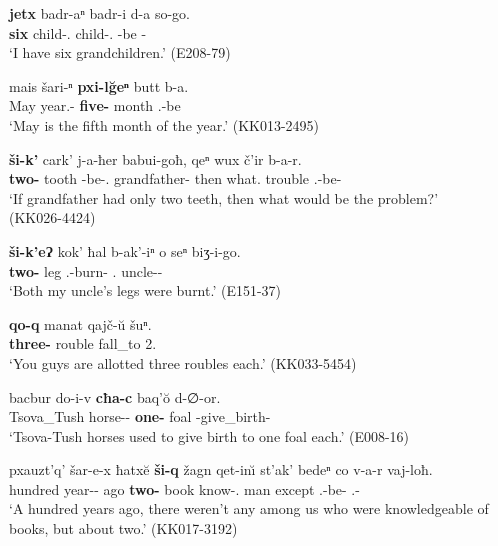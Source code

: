 \begin{exe}
	\ex\label{simplenp-ex4} \begin{xlist}
		
		\ex\label{simplenp-ex4a}
		\gll \textbf{jetx} badr-aⁿ badr-i d-a so-go. \\
		\textbf{six} child-{\Gen}.{\Pl} child-{\Nom}.{\Pl} {\D}-be {\Fsg}-{\Adess} \\
		\trans `I have six grandchildren.'
		\hfill (E208-79)
		
		\ex\label{simplenp-ex4b}
		\gll mais šari-ⁿ \textbf{pxi-l\u{g}eⁿ} butt b-a. \\
		May year.{\Obl}-{\Gen} \textbf{five-{\Ord}} month {\B}.{\Sg}-be \\
		\trans `May is the fifth month of the year.'
		\hfill (KK013-2495)
		
		\ex\label{simplenp-ex4c}
		\gll \textbf{ši-k'} cark' j-a-ħer babui-goħ, qeⁿ wux č'ir b-a-r. \\
		\textbf{two-{\Rstrct}} tooth {\J}-be-{\Cond}.{\Aor} grandfather-{\Adess} then what.{\Nom} trouble {\B}.{\Sg}-be-{\Imprf} \\
		\trans `If grandfather had only two teeth, then what would be the problem?' \\
		\hfill (KK026-4424)
		
		\ex\label{simplenp-ex4d}
		\gll \textbf{ši-k'eɁ} kok' ħal b-ak'-iⁿ o seⁿ biʒ-i-go.    \\
		\textbf{two-{\Incl}} leg {\Pv} {\B}.{\Sg}-burn-{\Aor} {\Dist} {\Fsg}.{\Gen} uncle-{\Obl}-{\Adess} \\
		\trans `Both my uncle's legs were burnt.'
		\hfill (E151-37)
		
		\ex\label{simplenp-ex4e}
		\gll \textbf{qo-q} manat qajč-\u{u} šuⁿ. \\
		\textbf{three-{\Distr}} rouble fall\_to 2{\Pl}.{\Dat}  \\
		\trans `You guys are allotted three roubles each.'
		\hfill (KK033-5454)
		
		\ex\label{simplenp-ex4f}
		\gll bacbur do-i-v \textbf{cħa-c} baq'\u{o} d-∅-or. \\
		Tsova\_Tush horse-{\Pl}-{\Erg} \textbf{one-{\Distr}} foal {\D}-give\_birth-{\Imprf} \\
		\trans `Tsova-Tush horses used to give birth to one foal each.'
		\hfill (E008-16)
		
		\ex\label{simplenp-ex4g}
		\gll pxauzt'q' šar-e-x ħatx\u{e} \textbf{ši-q} žagn qet-in\u{\i} st'ak' bedeⁿ co v-a-r vaj-loħ.  \\
		hundred year-{\Obl}-{\Cont} ago \textbf{two-{\Approx}} book know-{\Ptcp}.{\Npst} man except {\Neg} {\M}.{\Sg}-be-{\Imprf} {\Fpl}.{\Incl}-{\Interess}    \\
		\trans `A hundred years ago, there weren't any among us who were knowledgeable of books, but about two.'
		\hfill (KK017-3192)
		
	\end{xlist}
\end{exe}


